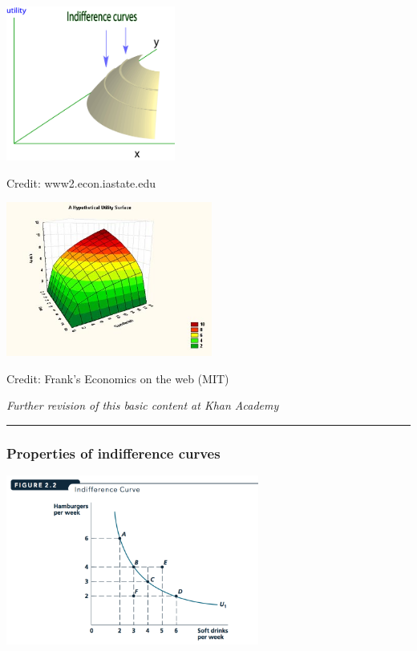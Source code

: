 \documentclass[]{article}
\begin{document}
\includegraphics[height=2in]{picsfigs/indifcurves_util_together.jpg}

Credit: www2.econ.iastate.edu

\includegraphics[height=2in]{picsfigs/indif_utility_2_400.jpg}

Credit: Frank's Economics on the web (MIT)

\emph{Further revision of this basic content at Khan Academy}

\begin{center}\rule{0.5\linewidth}{\linethickness}\end{center}

\hypertarget{properties-of-indifference-curves}{%
\subsubsection{Properties of indifference curves}\label{properties-of-indifference-curves}}

\includegraphics[height=2.2in]{picsfigs/indifccurve.png}
\end{document}
